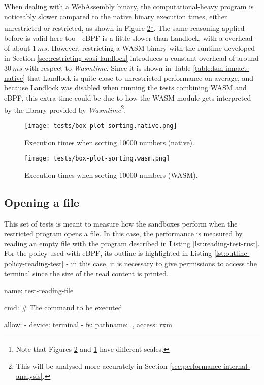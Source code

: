 When dealing with a WebAssembly binary, the computational-heavy program is noticeably slower
compared to the native binary execution times, either unrestricted or restricted, as shown in Figure
\ref{fig:distribution-sorting-wasm}\footnote{Note that Figures \ref{fig:distribution-sorting-wasm} and \ref{fig:distribution-sorting-native}
have different scales.}.
The same reasoning applied before is valid here too - eBPF is a little slower than Landlock, with a overhead
of about $1\ ms$.
However, restricting a WASM binary with the runtime developed in Section \ref{sec:restricting-wasi-landlock}
introduces a constant overhead of around $30\ ms$ with respect to \textit{Wasmtime}.
Since it is shown in Table \ref{table:lsm-impact-native} that Landlock is quite close to
unrestricted performance on average, and because Landlock was disabled when running
the tests combining WASM and eBPF, this extra time could be due to how the WASM module gets
interpreted by the library provided by \textit{Wasmtime}\footnote{This will be analysed more
accurately in Section \ref{sec:performance-internal-analysis}.}.

\begin{figure}[ht]
  \centering
  \texttt{[image: tests/box-plot-sorting.native.png]}
  \caption{Execution times when sorting 10000 numbers (native).}
  \label{fig:distribution-sorting-native}
\end{figure}

\begin{figure}[ht!]
  \centering
  \texttt{[image: tests/box-plot-sorting.wasm.png]}
  \caption{Execution times when sorting 10000 numbers (WASM).}
  \label{fig:distribution-sorting-wasm}
\end{figure}

\subsection{Opening a file}

This set of tests is meant to measure how the sandboxes perform when the restricted program opens a file.
In this case, the performance is measured by reading an empty file with the program described in Listing \ref{lst:reading-test-rust}.
For the policy used with eBPF, its outline is highlighted in Listing \ref{lst:outline-policy-reading-test}
- in this case, it is necessary to give permissions to access the terminal since the size of the read content is printed. 

\vspace*{0.5cm}
\begin{code}[language=yaml, caption=The outline of the policy used for testing the reading program., label=lst:outline-policy-reading-test]
name: test-reading-file

cmd: # The command to be executed

allow:
  - device: terminal
  - fs: {pathname: ., access: rxm}
\end{code}

